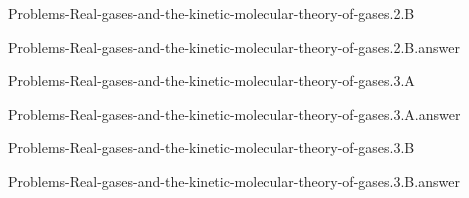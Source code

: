 \documentclass[main.tex]{subfiles}
\newcommand\chapterlabel{}
\begin{document}
\renewcommand\chapterlabel{Ch-Gas}
\begin{question}[ID=\the\value{numA}]
{Problems-Real-gases-and-the-kinetic-molecular-theory-of-gases.2.B}
\end{question}
   \begin{Form}
   \TextField[multiline,backgroundcolor=gray!20,borderwidth=0,width=0.43\textwidth  ,height=115pt, name=\the\value{numA}]  { }\end{Form}
\begin{solution}
{Problems-Real-gases-and-the-kinetic-molecular-theory-of-gases.2.B.answer}
\hspace{0.1cm}
\end{solution}


\renewcommand\chapterlabel{Ch-Gas}
\begin{question}[ID=\the\value{numA}]
{Problems-Real-gases-and-the-kinetic-molecular-theory-of-gases.3.A}
\end{question}
   \begin{Form}
   \TextField[multiline,backgroundcolor=gray!20,borderwidth=0,width=0.43\textwidth  ,height=115pt, name=\the\value{numA}]  { }\end{Form}
\begin{solution}
{Problems-Real-gases-and-the-kinetic-molecular-theory-of-gases.3.A.answer}
\hspace{0.1cm}
\end{solution}


\renewcommand\chapterlabel{Ch-Gas}
\begin{question}[ID=\the\value{numA}]
{Problems-Real-gases-and-the-kinetic-molecular-theory-of-gases.3.B}
\end{question}
   \begin{Form}
   \TextField[multiline,backgroundcolor=gray!20,borderwidth=0,width=0.43\textwidth  ,height=115pt, name=\the\value{numA}]  { }\end{Form}
\begin{solution}
{Problems-Real-gases-and-the-kinetic-molecular-theory-of-gases.3.B.answer}
\hspace{0.1cm}
\end{solution}
\end{document}
